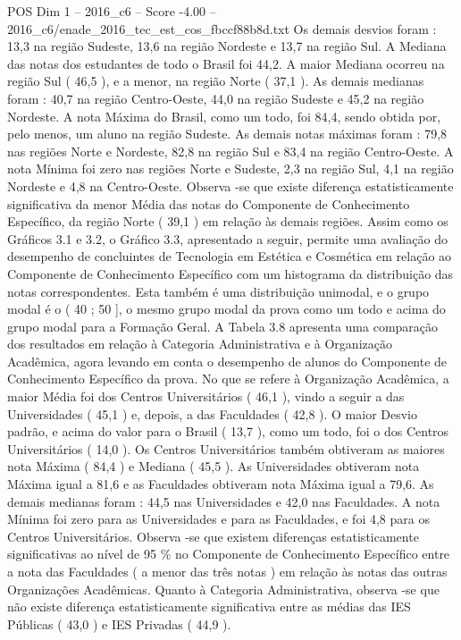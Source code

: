 \begin{textsample}{POS Dim 1 – 2016\_c6 – Score -4.00 – 2016\_c6/enade\_2016\_tec\_est\_cos\_fbccf88b8d.txt}
Os demais desvios foram : 13,3 na região Sudeste, 13,6 na região Nordeste e 13,7 na região Sul.
A Mediana das notas dos estudantes de todo o Brasil foi 44,2.
A maior Mediana ocorreu na região Sul ( 46,5 ), e a menor, na região Norte ( 37,1 ).
As demais medianas foram : 40,7 na região Centro-Oeste, 44,0 na região Sudeste e 45,2 na região Nordeste.
A nota Máxima do Brasil, como um todo, foi 84,4, sendo obtida por, pelo menos, um aluno na região Sudeste.
As demais notas máximas foram : 79,8 nas regiões Norte e Nordeste, 82,8 na região Sul e 83,4 na região Centro-Oeste.
A nota Mínima foi zero nas regiões Norte e Sudeste, 2,3 na região Sul, 4,1 na região Nordeste e 4,8 na Centro-Oeste.
Observa -se que existe diferença estatisticamente significativa da menor Média das notas do Componente de Conhecimento Específico, da região Norte ( 39,1 ) em relação às demais regiões.
Assim como os Gráficos 3.1 e 3.2, o Gráfico 3.3, apresentado a seguir, permite uma avaliação do desempenho de concluintes de Tecnologia em Estética e Cosmética em relação ao Componente de Conhecimento Específico com um histograma da distribuição das notas correspondentes.
Esta também é uma distribuição unimodal, e o grupo modal é o ( 40 ; 50 ], o mesmo grupo modal da prova como um todo e acima do grupo modal para a Formação Geral.
A Tabela 3.8 apresenta uma comparação dos resultados em relação à Categoria Administrativa e à Organização Acadêmica, agora levando em conta o desempenho de alunos do Componente de Conhecimento Específico da prova.
No que se refere à Organização Acadêmica, a maior Média foi dos Centros Universitários ( 46,1 ), vindo a seguir a das Universidades ( 45,1 ) e, depois, a das Faculdades ( 42,8 ).
O maior Desvio padrão, e acima do valor para o Brasil ( 13,7 ), como um todo, foi o dos Centros Universitários ( 14,0 ).
Os Centros Universitários também obtiveram as maiores nota Máxima ( 84,4 ) e Mediana ( 45,5 ).
As Universidades obtiveram nota Máxima igual a 81,6 e as Faculdades obtiveram nota Máxima igual a 79,6.
As demais medianas foram : 44,5 nas Universidades e 42,0 nas Faculdades.
A nota Mínima foi zero para as Universidades e para as Faculdades, e foi 4,8 para os Centros Universitários.
Observa -se que existem diferenças estatisticamente significativas ao nível de 95 \% no Componente de Conhecimento Específico entre a nota das Faculdades ( a menor das três notas ) em relação às notas das outras Organizações Acadêmicas.
Quanto à Categoria Administrativa, observa -se que não existe diferença estatisticamente significativa entre as médias das IES Públicas ( 43,0 ) e IES Privadas ( 44,9 ).

\end{textsample}

